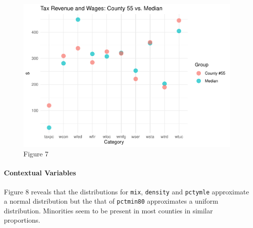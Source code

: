 \documentclass[]{article}
\let\oldparagraph\paragraph
\renewcommand{\paragraph}[1]{\oldparagraph{#1}\mbox{}}
\begin{document}
\begin{figure}

{\centering \includegraphics{lab_3_v7_files/figure-latex/unnamed-chunk-21-1} 

}

\caption{Figure 7}\label{fig:unnamed-chunk-21}
\end{figure}

\hypertarget{contextual-variables-1}{%
\paragraph{Contextual Variables}\label{contextual-variables-1}}

Figure 8 reveals that the distributions for \texttt{mix},
\texttt{density} and \texttt{pctymle} approximate a normal distribution
but the that of \texttt{pctmin80} approximates a uniform distribution.
Minorities seem to be present in most counties in similar proportions.
\end{document}
